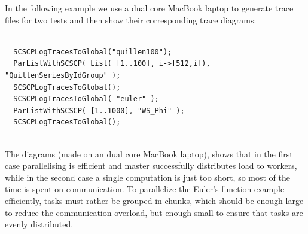 \documentclass[a4paper,11pt]{report}
\begin{document}
{{{ In the following example we use a dual core MacBook laptop to generate trace
files for two tests and then show their corresponding trace diagrams: 
\begin{Verbatim}[commandchars=!@|,fontsize=\small,frame=single,label=Example]
  
  SCSCPLogTracesToGlobal("quillen100");
  ParListWithSCSCP( List( [1..100], i->[512,i]), "QuillenSeriesByIdGroup" );
  SCSCPLogTracesToGlobal();
  SCSCPLogTracesToGlobal( "euler" );
  ParListWithSCSCP( [1..1000], "WS_Phi" );
  SCSCPLogTracesToGlobal();
  
\end{Verbatim}
 \centerline{}  \vspace{10pt}\centerline{}   The diagrams (made on an dual core MacBook laptop), shows that in the first
case parallelising is efficient and master successfully distributes load to
workers, while in the second case a single computation is just too short, so
most of the time is spent on communication. To parallelize the Euler's
function example efficiently, tasks must rather be grouped in chunks, which
should be enough large to reduce the communication overload, but enough small
to ensure that tasks are evenly distributed. 

}}}
\end{document}
